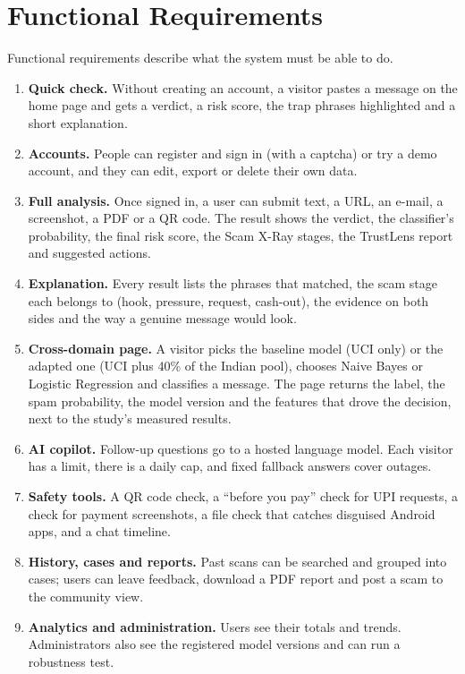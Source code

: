 \section{Functional Requirements}\label{sec:funcreq}
Functional requirements describe what the system must be able to do.
\begin{enumerate}
\item \textbf{Quick check.} Without creating an account, a visitor pastes a message on the home page and gets a verdict, a risk score, the trap phrases highlighted and a short explanation.
\item \textbf{Accounts.} People can register and sign in (with a captcha) or try a demo account, and they can edit, export or delete their own data.
\item \textbf{Full analysis.} Once signed in, a user can submit text, a URL, an e-mail, a screenshot, a PDF or a QR code. The result shows the verdict, the classifier's probability, the final risk score, the Scam X-Ray stages, the TrustLens report and suggested actions.
\item \textbf{Explanation.} Every result lists the phrases that matched, the scam stage each belongs to (hook, pressure, request, cash-out), the evidence on both sides and the way a genuine message would look.
\item \textbf{Cross-domain page.} A visitor picks the baseline model (UCI only) or the adapted one (UCI plus 40\% of the Indian pool), chooses Naive Bayes or Logistic Regression and classifies a message. The page returns the label, the spam probability, the model version and the features that drove the decision, next to the study's measured results.
\item \textbf{AI copilot.} Follow-up questions go to a hosted language model. Each visitor has a limit, there is a daily cap, and fixed fallback answers cover outages.
\item \textbf{Safety tools.} A QR code check, a ``before you pay'' check for UPI requests, a check for payment screenshots, a file check that catches disguised Android apps, and a chat timeline.
\item \textbf{History, cases and reports.} Past scans can be searched and grouped into cases; users can leave feedback, download a PDF report and post a scam to the community view.
\item \textbf{Analytics and administration.} Users see their totals and trends. Administrators also see the registered model versions and can run a robustness test.
\end{enumerate}

